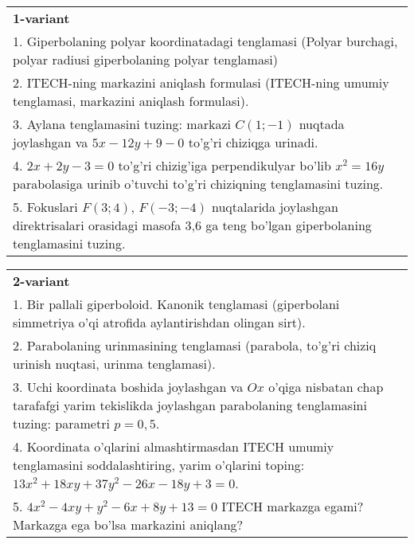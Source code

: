 \documentclass{article}
\begin{document}
\large
{}


\begin{tabular}{m{17cm}}
\textbf{1-variant}\\
1. Giperbolaning polyar koordinatadagi tenglamasi (Polyar burchagi, polyar radiusi giperbolaning polyar tenglamasi)\\

2. ITECH-ning markazini aniqlash formulasi (ITECH-ning umumiy tenglamasi, markazini aniqlash formulasi).\\

3. Aylana tenglamasini tuzing: markazi $C(1;-1)$ nuqtada joylashgan va $5x-12y+9-0$ to'g'ri chiziqga urinadi.\\

4. $2x + 2y - 3 = 0$ to'g'ri chizig'iga perpendikulyar bo'lib $x^{2} = 16y$ parabolasiga urinib o'tuvchi to'g'ri chiziqning tenglamasini tuzing.  \\

5. Fokuslari $F(3;4)$, $F(-3;-4)$ nuqtalarida joylashgan direktrisalari orasidagi masofa 3,6 ga teng bo'lgan giperbolaning tenglamasini tuzing.  
\end{tabular}
\vspace{1cm}


\begin{tabular}{m{17cm}}
\textbf{2-variant}\\
1. Bir pallali giperboloid. Kanonik tenglamasi (giperbolani simmetriya o'qi atrofida aylantirishdan olingan sirt).\\

2. Parabolaning urinmasining tenglamasi (parabola, to'g'ri chiziq urinish nuqtasi, urinma tenglamasi).\\

3. Uchi koordinata boshida joylashgan va $Ox$ o'qiga nisbatan chap tarafafgi yarim tekislikda joylashgan parabolaning tenglamasini tuzing: parametri $p=0,5$.\\

4. Koordinata o'qlarini almashtirmasdan ITECH umumiy tenglamasini soddalashtiring, yarim o'qlarini toping: $13x^{2} + 18xy + 37y^{2} - 26x - 18y + 3 = 0$.  \\

5. $4x^{2} - 4xy + y^{2} - 6x + 8y + 13 = 0$ ITECH markazga egami? Markazga ega bo'lsa markazini aniqlang?  
\end{tabular}
\vspace{1cm}
\end{document}

